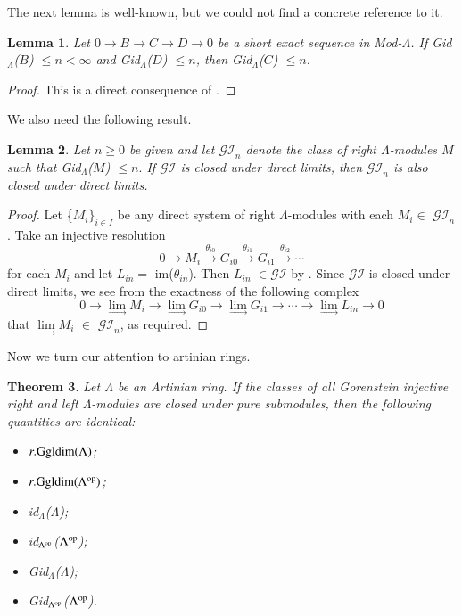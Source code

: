\documentclass[11pt,a4paper]{article}
\newtheorem{thm}{Theorem}[section]
\newtheorem{lem}[thm]{Lemma}
\begin{document}
   The next lemma is well-known, but we could not find a concrete reference to it.
  \begin{lem}\label{lem3}  Let
$0\rightarrow  B    \rightarrow C\rightarrow  D\rightarrow 0   $ be a  short exact sequence in {\rm Mod-}$\Lambda$.
If  {\rm Gid}$_{\Lambda}$($B$)  $\leq n < \infty$ and   {\rm Gid}$_{\Lambda}$($D$)  $\leq n$, then  {\rm Gid}$_{\Lambda}$($C$)  $\leq n $.\end{lem}
\begin{proof} This is a direct consequence of  {\rm \cite[Theorems  2.22 and 2.24]{hol}}. \end{proof}

 We also need the following   result.
\begin{lem} \label{lem4} Let  $n\geq 0$  be given and   let $\mathscr{GI}_{n}$ denote  the class of right $\Lambda$-modules $M$
 such that   {\rm Gid}$_{\Lambda}${\rm (}$M${\rm )}  $\leq n.$  If $\mathscr{GI}$ is closed under direct limits, then $\mathscr{GI}_{n}$ is also closed under direct limits.\end{lem}

\begin{proof} Let \{$M_{i}\}_{i\in I}$ be any direct system of
right $\Lambda$-modules   with each  $M_{i} \in$  $\mathscr{GI}_{n}$.
 Take an  injective resolution
 $$ 0  \longrightarrow M_{i}\stackrel {\theta_{i0}}
\longrightarrow
G_{i0}\stackrel {\theta_{i1}} \longrightarrow G_{i1}\stackrel {\theta_{i2}}
\longrightarrow \cdots   $$
 for each  $M_{i}$
and let $L_{in} =$ im($\theta_{in}$). Then   $L_{in} $  $\in \mathscr{GI}$ by \cite[Theorem  2.22 (iv)]{hol}. Since       $ \mathscr{GI}$
 is closed under direct limits, we see from the exactness  of the following complex
  $$0 \rightarrow \lim\limits_{ \longrightarrow }M_{i}\rightarrow \lim\limits_{ \longrightarrow }G_{i0}\rightarrow \lim\limits_{ \longrightarrow }G_{i1} \rightarrow
\cdots    \rightarrow \lim\limits_{ \longrightarrow }L_{in}\rightarrow 0$$
that  $\lim\limits_{ \longrightarrow }M_{i} $  $ \in$  $\mathscr{GI}_{n}$, as required.
\end{proof}



Now we turn our attention to artinian rings.

\begin{thm}\label{thm3}  Let  $\Lambda$ be an Artinian ring. If   the   classes of all Gorenstein     injective
   right and left  $\Lambda$-modules   are closed under pure submodules, then the following quantities are identical:
\begin{itemize}

\item[$(1)$] $r.{\rm Ggldim(}\Lambda)$;
\item[$(2)$] $r.{\rm Ggldim(}\Lambda^{{\rm op}})$;
\item[$(3)$]  {\rm id}$_{\Lambda}$($\Lambda$);
 \item[$(4)$] {\rm id}$_{\Lambda^{{\rm op}}}$($\Lambda^{{\rm op}}$);
 \item[$(5)$]  {\rm Gid}$_{\Lambda}$($\Lambda$);
 \item[$(6)$] {\rm Gid}$_{\Lambda^{{\rm op}}}$($\Lambda^{{\rm op}}$).\end{itemize}\end{thm}
\end{document}
